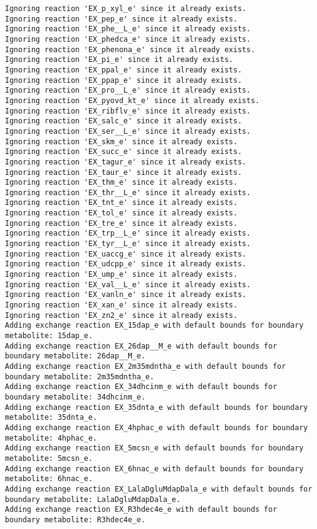 \documentclass[
  letterpaper,
  DIV=11,
  numbers=noendperiod]{scrartcl}
\begin{document}
\begin{verbatim}
Ignoring reaction 'EX_p_xyl_e' since it already exists.
Ignoring reaction 'EX_pep_e' since it already exists.
Ignoring reaction 'EX_phe__L_e' since it already exists.
Ignoring reaction 'EX_phedca_e' since it already exists.
Ignoring reaction 'EX_phenona_e' since it already exists.
Ignoring reaction 'EX_pi_e' since it already exists.
Ignoring reaction 'EX_ppal_e' since it already exists.
Ignoring reaction 'EX_ppap_e' since it already exists.
Ignoring reaction 'EX_pro__L_e' since it already exists.
Ignoring reaction 'EX_pyovd_kt_e' since it already exists.
Ignoring reaction 'EX_ribflv_e' since it already exists.
Ignoring reaction 'EX_salc_e' since it already exists.
Ignoring reaction 'EX_ser__L_e' since it already exists.
Ignoring reaction 'EX_skm_e' since it already exists.
Ignoring reaction 'EX_succ_e' since it already exists.
Ignoring reaction 'EX_tagur_e' since it already exists.
Ignoring reaction 'EX_taur_e' since it already exists.
Ignoring reaction 'EX_thm_e' since it already exists.
Ignoring reaction 'EX_thr__L_e' since it already exists.
Ignoring reaction 'EX_tnt_e' since it already exists.
Ignoring reaction 'EX_tol_e' since it already exists.
Ignoring reaction 'EX_tre_e' since it already exists.
Ignoring reaction 'EX_trp__L_e' since it already exists.
Ignoring reaction 'EX_tyr__L_e' since it already exists.
Ignoring reaction 'EX_uaccg_e' since it already exists.
Ignoring reaction 'EX_udcpp_e' since it already exists.
Ignoring reaction 'EX_ump_e' since it already exists.
Ignoring reaction 'EX_val__L_e' since it already exists.
Ignoring reaction 'EX_vanln_e' since it already exists.
Ignoring reaction 'EX_xan_e' since it already exists.
Ignoring reaction 'EX_zn2_e' since it already exists.
Adding exchange reaction EX_15dap_e with default bounds for boundary metabolite: 15dap_e.
Adding exchange reaction EX_26dap__M_e with default bounds for boundary metabolite: 26dap__M_e.
Adding exchange reaction EX_2m35mdntha_e with default bounds for boundary metabolite: 2m35mdntha_e.
Adding exchange reaction EX_34dhcinm_e with default bounds for boundary metabolite: 34dhcinm_e.
Adding exchange reaction EX_35dnta_e with default bounds for boundary metabolite: 35dnta_e.
Adding exchange reaction EX_4hphac_e with default bounds for boundary metabolite: 4hphac_e.
Adding exchange reaction EX_5mcsn_e with default bounds for boundary metabolite: 5mcsn_e.
Adding exchange reaction EX_6hnac_e with default bounds for boundary metabolite: 6hnac_e.
Adding exchange reaction EX_LalaDgluMdapDala_e with default bounds for boundary metabolite: LalaDgluMdapDala_e.
Adding exchange reaction EX_R3hdec4e_e with default bounds for boundary metabolite: R3hdec4e_e.

\end{verbatim}
\end{document}
